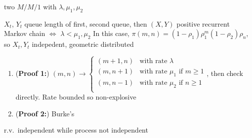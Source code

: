 \begin{setting}
    two $M/M/1$ with $\lambda, \mu_1, \mu_{2}$
\end{setting}

\begin{thm}
    $X_t$, $Y_t$ queue length of first, second queue, then $(X, Y)$ positive recurrent Markov chain $\iff$ $\lambda < \mu_1, \mu_2$
    In this case, $\pi(m, n) = (1 - \rho_1)\rho_1^m (1 - \rho_2)\rho_n$, so $X_t, Y_t$ indepedent, geometric distributed
\end{thm}
\begin{pf}
    \begin{enumerate}
        \item (\textbf{Proof 1:}) $(m , n) \rightarrow \begin{cases}
                                                           (m + 1, n) & \text{with rate }\lambda\\
                                                           (m , n + 1) & \text{with rate }\mu_1 \text{ if } m \geq 1\\
                                                           (m , n - 1) & \text{with rate }\mu_2 \text{ if } n \geq 1\\
        \end{cases}$, then check directly.
        Rate bounded so non-explosive
        \item (\textbf{Proof 2:}) Burke's
    \end{enumerate}
\end{pf}

\begin{fact}
    r.v.\ independent while process not independent
\end{fact}

